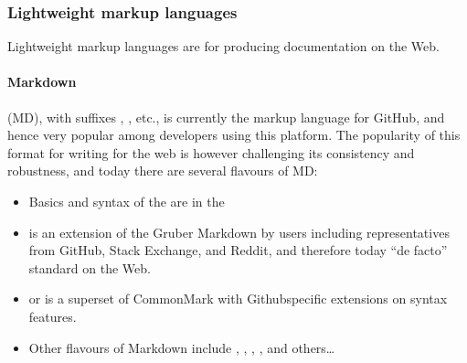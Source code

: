\documentclass[a4paper,12pt,english]{sphinxhowto}
\begin{document}


\subsubsection{Lightweight markup languages}
\label{\detokenize{DDHH:lightweight-markup-languages}}\label{\detokenize{DDHH:rst-str}}
Lightweight markup languages are for producing documentation on the Web.



\paragraph{Markdown}
\label{\detokenize{DDHH:markdown}}
 (MD), with suffixes , , etc., is currently the markup language for GitHub,
and hence very popular among developers using this platform. The popularity of this format for writing
for the web is however challenging its consistency and robustness, and today there are several flavours of MD:
\begin{itemize}
\item {} 
Basics and syntax of the  are in the 

\item {} 
 is an extension of the Gruber Markdown by users including representatives from GitHub, Stack Exchange, and Reddit, and therefore today “de facto” standard on the Web.

\item {} 
 or  is a superset of CommonMark with Github\sphinxhyphen{}specific extensions on syntax features.

\item {} 
Other flavours of Markdown include , , , , and others…

\end{itemize}
\end{document}
